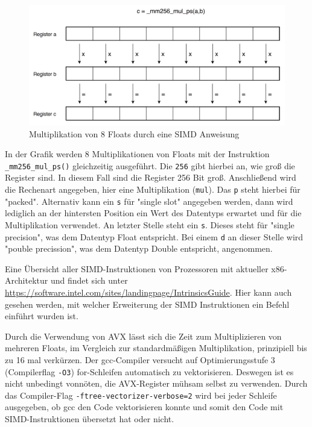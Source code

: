 \documentclass[../main.tex]{subfiles}
\begin{document}
\begin{figure}[!htbp]
	\centering
	\includegraphics[width=\textwidth]{../images/Benz/avx.png}
	\caption{Multiplikation von 8 Floats durch eine SIMD Anweisung} 
	\label{fig:avx}
\end{figure}

In der Grafik werden 8 Multiplikationen von Floats mit der Instruktion \linebreak  \texttt{\_mm256\_mul\_ps()} gleichzeitig ausgeführt. Die \texttt{256} gibt hierbei an, wie groß die Register sind. In diesem Fall sind die Register 256 Bit groß. Anschließend wird die Rechenart angegeben, hier eine Multiplikation (\texttt{mul}). Das \texttt{p} steht hierbei für "packed". Alternativ kann ein \texttt{s} für "single slot" angegeben werden, dann wird lediglich an der hintersten Position ein Wert des Datentyps erwartet und für die Multiplikation verwendet. An letzter Stelle steht ein \texttt{s}. Dieses steht für "single precision", was dem Datentyp Float entspricht. Bei einem \texttt{d} an dieser Stelle wird "pouble precission", was dem Datentyp Double entspricht, angenommen.

Eine Übersicht aller SIMD-Instruktionen von Prozessoren mit aktueller x86-Architektur und findet sich unter \url{https://software.intel.com/sites/landingpage/IntrinsicsGuide}. Hier kann auch gesehen werden, mit welcher Erweiterung der SIMD Instruktionen ein Befehl einführt wurden ist.

Durch die Verwendung von AVX lässt sich die Zeit zum Multiplizieren von mehreren Floats, im Vergleich zur standardmäßigen Multiplikation, prinzipiell bis zu 16 mal verkürzen. Der gcc-Compiler versucht auf Optimierungsstufe 3 (Compilerflag \texttt{-O3}) for-Schleifen automatisch zu vektorisieren. Deswegen ist es nicht unbedingt vonnöten, die AVX-Register mühsam selbst zu verwenden. Durch das Compiler-Flag \texttt{-ftree-vectorizer-verbose=2} wird bei jeder Schleife ausgegeben, ob gcc den Code vektorisieren konnte und somit den Code mit SIMD-Instruktionen übersetzt hat oder nicht.
\end{document}
